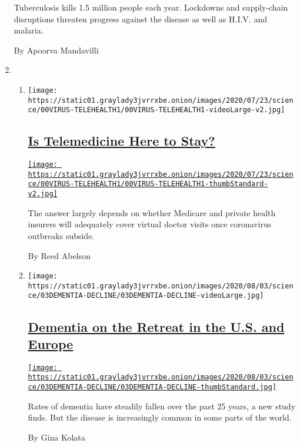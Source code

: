 \begin{enumerate}
  Tuberculosis kills 1.5 million people each year. Lockdowns and
  supply-chain disruptions threaten progress against the disease as well
  as H.I.V. and malaria.

  By Apoorva Mandavilli
\item
  \begin{enumerate}
  \def\labelenumii{\arabic{enumii}.}
  \item
    \texttt{[image: https://static01.graylady3jvrrxbe.onion/images/2020/07/23/science/00VIRUS-TELEHEALTH1/00VIRUS-TELEHEALTH1-videoLarge-v2.jpg]}

    \hypertarget{is-telemedicine-here-to-stay}{%
    \subsection{\texorpdfstring{\href{/2020/08/03/health/covid-telemedicine-congress.html}{Is
    Telemedicine Here to
    Stay?}}{Is Telemedicine Here to Stay?}}\label{is-telemedicine-here-to-stay}}

    \href{/2020/08/03/health/covid-telemedicine-congress.html}{\texttt{[image: https://static01.graylady3jvrrxbe.onion/images/2020/07/23/science/00VIRUS-TELEHEALTH1/00VIRUS-TELEHEALTH1-thumbStandard-v2.jpg]}}

    The answer largely depends on whether Medicare and private health
    insurers will adequately cover virtual doctor visits once
    coronavirus outbreaks subside.

    By Reed Abelson
  \item
    \texttt{[image: https://static01.graylady3jvrrxbe.onion/images/2020/08/03/science/03DEMENTIA-DECLINE/03DEMENTIA-DECLINE-videoLarge.jpg]}

    \hypertarget{dementia-on-the-retreat-in-the-us-and-europe}{%
    \subsection{\texorpdfstring{\href{/2020/08/03/health/alzheimers-dementia-rates.html}{Dementia
    on the Retreat in the U.S. and
    Europe}}{Dementia on the Retreat in the U.S. and Europe}}\label{dementia-on-the-retreat-in-the-us-and-europe}}

    \href{/2020/08/03/health/alzheimers-dementia-rates.html}{\texttt{[image: https://static01.graylady3jvrrxbe.onion/images/2020/08/03/science/03DEMENTIA-DECLINE/03DEMENTIA-DECLINE-thumbStandard.jpg]}}

    Rates of dementia have steadily fallen over the past 25 years, a new
    study finds. But the disease is increasingly common in some parts of
    the world.

    By Gina Kolata
  \end{enumerate}
\end{enumerate}

